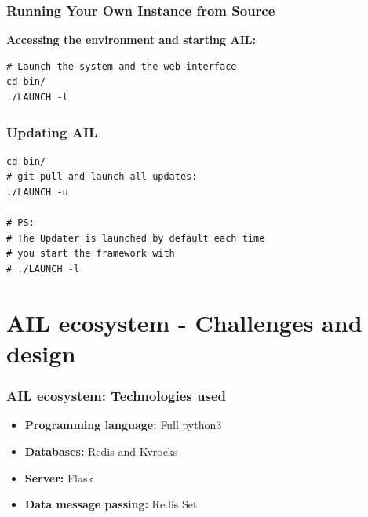 \documentclass[10pt,aspectratio=169, colorlinks=true, linkcolor=circlBlue]{beamer}
\begin{document}
\begin{frame}[fragile]
    \frametitle{Running Your Own Instance from Source}

    \textbf{Accessing the environment and starting AIL:}

    \begin{tcolorbox}[colback=black!85, coltext=green, title=Start AIL from source:, fonttitle=\bfseries, arc=2mm, boxrule=0.4pt]
\begin{verbatim}
# Launch the system and the web interface
cd bin/
./LAUNCH -l
\end{verbatim}
    \end{tcolorbox}

\end{frame}

\begin{frame}[fragile]
    \frametitle{Updating AIL}
    \begin{tcolorbox}[colback=black!85, coltext=green, title=Launch the updater:, fonttitle=\bfseries]
\begin{verbatim}
cd bin/
# git pull and launch all updates:
./LAUNCH -u

# PS:
# The Updater is launched by default each time
# you start the framework with
# ./LAUNCH -l
\end{verbatim}
    \end{tcolorbox}
\end{frame}


\section{AIL ecosystem - Challenges and design}

\begin{frame}
    \frametitle{AIL ecosystem: Technologies used}
    \begin{itemize}
        \item[] \textbf{Programming language:} Full python3
        \item[] \textbf{Databases:} Redis and Kvrocks
        \item[] \textbf{Server:} Flask
        \item[] \textbf{Data message passing:} Redis Set
    \end{itemize}
\end{frame}
\end{document}
